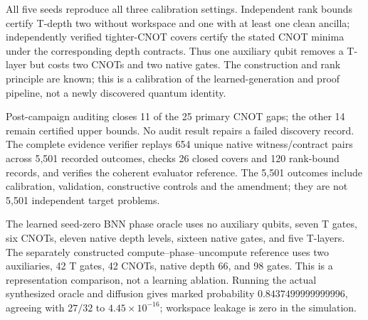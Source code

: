All five seeds reproduce all three calibration settings. Independent rank bounds certify T-depth two without workspace and one with at least one clean ancilla; independently verified tighter-CNOT covers certify the stated CNOT minima under the corresponding depth contracts. Thus one auxiliary qubit removes a T-layer but costs two CNOTs and two native gates. The construction and rank principle are known; this is a calibration of the learned-generation and proof pipeline, not a newly discovered quantum identity.

Post-campaign auditing closes 11 of the 25 primary CNOT gaps; the other 14 remain certified upper bounds. No audit result repairs a failed discovery record. The complete evidence verifier replays 654 unique native witness/contract pairs across 5,501 recorded outcomes, checks 26 closed covers and 120 rank-bound records, and verifies the coherent evaluator reference. The 5,501 outcomes include calibration, validation, constructive controls and the amendment; they are not 5,501 independent target problems.

The learned seed-zero BNN phase oracle uses no auxiliary qubits, seven T gates, six CNOTs, eleven native depth levels, sixteen native gates, and five T-layers. The separately constructed compute--phase--uncompute reference uses two auxiliaries, 42 T gates, 42 CNOTs, native depth 66, and 98 gates. This is a representation comparison, not a learning ablation. Running the actual synthesized oracle and diffusion gives marked probability $0.8437499999999996$, agreeing with $27/32$ to $4.45\times10^{-16}$; workspace leakage is zero in the simulation.
